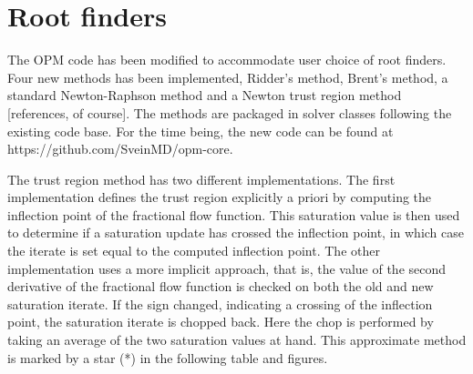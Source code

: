 \documentclass[a4paper,12pt]{report}
\begin{document}
%
%
%
%

\section{Root finders}
The OPM code has been modified to accommodate user choice of root finders. Four new methods has been implemented, Ridder's method, Brent's method, a standard Newton-Raphson method and a Newton trust region method [references, of course]. The methods are packaged in solver classes following the existing code base. For the time being, the new code can be found at https://github.com/SveinMD/opm-core.

The trust region method has two different implementations. The first implementation defines the trust region explicitly a priori by computing the inflection point of the fractional flow function. This saturation value is then used to determine if a saturation update has crossed the inflection point, in which case the iterate is set equal to the computed inflection point. The other implementation uses a more implicit approach, that is, the value of the second derivative of the fractional flow function is checked on both the old and new saturation iterate. If the sign changed, indicating a crossing of the inflection point, the saturation iterate is chopped back. Here the chop is performed by taking an average of the two saturation values at hand. This approximate method is marked by a star (*) in the following table and figures.

\end{document}
